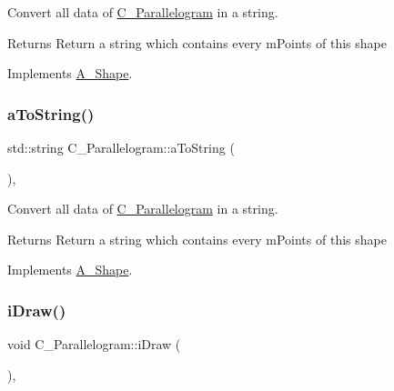 Convert all data of \hyperlink{classC__Parallelogram}{C\+\_\+\+Parallelogram} in a string. 

\begin{DoxyReturn}{Returns}
Return a string which contains every m\+Points of this shape 
\end{DoxyReturn}


Implements \hyperlink{classA__Shape_ad8804b4e74543db374af6892367b7c2e}{A\+\_\+\+Shape}.

\mbox{\label{classC__Parallelogram_add67ef2aba5e14c27e30a958e4843223}} 
\subsubsection{\texorpdfstring{a\+To\+String()}{aToString()}\hspace{0.1cm}{\footnotesize\ttfamily [2/2]}}
{\footnotesize\ttfamily std\+::string C\+\_\+\+Parallelogram\+::a\+To\+String (\begin{DoxyParamCaption}{ }\end{DoxyParamCaption})\hspace{0.3cm}{\ttfamily [override]}, {\ttfamily [virtual]}}



Convert all data of \hyperlink{classC__Parallelogram}{C\+\_\+\+Parallelogram} in a string. 

\begin{DoxyReturn}{Returns}
Return a string which contains every m\+Points of this shape 
\end{DoxyReturn}


Implements \hyperlink{classA__Shape_ad8804b4e74543db374af6892367b7c2e}{A\+\_\+\+Shape}.

\mbox{\label{classC__Parallelogram_a6d43cc787a39def68c7b7de4a33caf5e}} 
\subsubsection{\texorpdfstring{i\+Draw()}{iDraw()}\hspace{0.1cm}{\footnotesize\ttfamily [1/4]}}
{\footnotesize\ttfamily void C\+\_\+\+Parallelogram\+::i\+Draw (\begin{DoxyParamCaption}{ }\end{DoxyParamCaption})\hspace{0.3cm}{\ttfamily [override]}, {\ttfamily [virtual]}}



